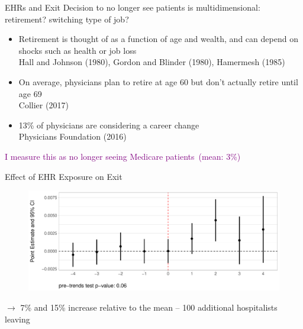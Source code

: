 \documentclass[notes,11pt, aspectratio=169]{beamer}
\begin{document}
\begin{frame}{EHRs and Exit}
Decision to no longer see patients is multidimensional: retirement? switching type of job?
                \vspace{2mm}
\begin{itemize}
    \item Retirement is thought of as a function of age and wealth, and can depend on shocks such as health or job loss\\ \scriptsize{Hall and Johnson (1980), Gordon and Blinder (1980), Hamermesh (1985)}
                \vspace{3mm}
                \normalsize
                
    \item On average, physicians plan to retire at age 60 but don't actually retire until age 69 \\ \scriptsize{Collier (2017)}
                \vspace{3mm}
                \normalsize
                
    \item 13\% of physicians are considering a career change\\ \scriptsize{Physicians Foundation (2016)}
                \normalsize

\end{itemize}

\vspace{5mm}
\textcolor{purple}{I measure this as no longer seeing Medicare patients\ (mean: 3\%)}
\end{frame}


\begin{frame}{Effect of EHR Exposure on Exit}
\label{Effect of EHR Exposure on Exit}
\begin{figure}[ht]
    \centering
    \includegraphics[scale=.5]{Objects/retire_plot_all.pdf}
\end{figure}
$\rightarrow$ 7\% and 15\% increase relative to the mean -- 100 additional hospitalists leaving

\hyperlink{Robustness: Retirement}{}
\end{frame}
\end{document}
